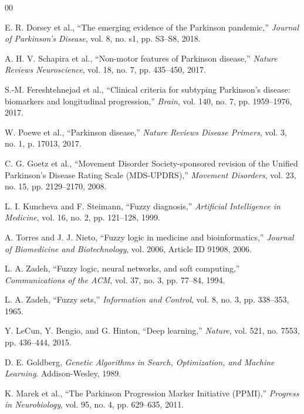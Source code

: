 \documentclass[conference]{IEEEtran}
\begin{document}
\begin{thebibliography}{00}

E. R. Dorsey et al., ``The emerging evidence of the Parkinson pandemic,'' \textit{Journal of Parkinson's Disease}, vol. 8, no. s1, pp. S3--S8, 2018.

A. H. V. Schapira et al., ``Non-motor features of Parkinson disease,'' \textit{Nature Reviews Neuroscience}, vol. 18, no. 7, pp. 435--450, 2017.

S.-M. Fereshtehnejad et al., ``Clinical criteria for subtyping Parkinson's disease: biomarkers and longitudinal progression,'' \textit{Brain}, vol. 140, no. 7, pp. 1959--1976, 2017.

W. Poewe et al., ``Parkinson disease,'' \textit{Nature Reviews Disease Primers}, vol. 3, no. 1, p. 17013, 2017.

C. G. Goetz et al., ``Movement Disorder Society-sponsored revision of the Unified Parkinson's Disease Rating Scale (MDS-UPDRS),'' \textit{Movement Disorders}, vol. 23, no. 15, pp. 2129--2170, 2008.

L. I. Kuncheva and F. Steimann, ``Fuzzy diagnosis,'' \textit{Artificial Intelligence in Medicine}, vol. 16, no. 2, pp. 121--128, 1999.

A. Torres and J. J. Nieto, ``Fuzzy logic in medicine and bioinformatics,'' \textit{Journal of Biomedicine and Biotechnology}, vol. 2006, Article ID 91908, 2006.

L. A. Zadeh, ``Fuzzy logic, neural networks, and soft computing,'' \textit{Communications of the ACM}, vol. 37, no. 3, pp. 77--84, 1994.

L. A. Zadeh, ``Fuzzy sets,'' \textit{Information and Control}, vol. 8, no. 3, pp. 338--353, 1965.

Y. LeCun, Y. Bengio, and G. Hinton, ``Deep learning,'' \textit{Nature}, vol. 521, no. 7553, pp. 436--444, 2015.

D. E. Goldberg, \textit{Genetic Algorithms in Search, Optimization, and Machine Learning}. Addison-Wesley, 1989.

K. Marek et al., ``The Parkinson Progression Marker Initiative (PPMI),'' \textit{Progress in Neurobiology}, vol. 95, no. 4, pp. 629--635, 2011.


\end{thebibliography}
\end{document}
